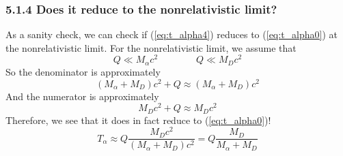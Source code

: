 \documentclass[12pt,a4paper]{article}
\begin{document}
\begin{solution_pset}
		\subsubsection*{5.1.4 Does it reduce to the nonrelativistic limit?}
			As a sanity check, we can check if (\ref{eq:t_alpha4}) reduces to
			(\ref{eq:t_alpha0}) at the nonrelativistic limit.
			For the nonrelativistic limit, we assume that
			\[
				Q\ll M_\alpha c^2\qquad \text{}\qquad Q\ll M_D c^2
			\]
			So the denominator is approximately
			\[
				(M_\alpha + M_D)c^2 + Q \approx (M_\alpha + M_D)c^2
			\]
			And the numerator is approximately
			\[
				M_D c^2 + Q \approx M_D c^2 
			\]
			Therefore, we see that it does in fact reduce to (\ref{eq:t_alpha0})!
			\[
				T_\alpha
				\approx
				Q
				\frac{
					 M_D c^2
				}{
					(M_\alpha + M_D) c^2
				}		
				=
				Q
				\frac{
					M_D
				}{
					M_\alpha + M_D
				} 
			\]
			\newpage

\end{solution_pset}
\end{document}
